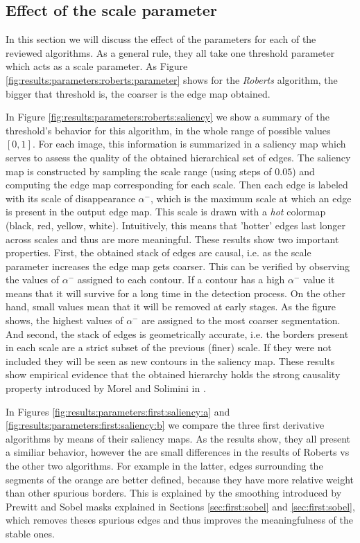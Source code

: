 \documentclass{ipol}
\numberwithin{equation}{section}
\numberwithin{table}{section}
\begin{document}
\subsection{Effect of the scale parameter}
In this section we will discuss the effect of the parameters for each of the reviewed algorithms. As a general rule, they all take one threshold parameter which acts as a scale parameter. As Figure \ref{fig:results:parameters:roberts:parameter} shows for the \emph{Roberts} algorithm, the bigger that threshold is, the coarser is the edge map obtained.

In Figure \ref{fig:results:parameters:roberts:saliency} we show a summary of the threshold's behavior for this algorithm, in the whole range of possible values $[0,1]$. For each image, this information is summarized in a saliency map which serves to assess the quality of the obtained hierarchical set of edges.
The saliency map is constructed by sampling the scale range (using steps of $0.05$) and computing the edge map corresponding for each scale. Then each edge is labeled with its scale of disappearance $\alpha^-$, which is the maximum scale at which an edge is present in the output edge map. This scale is drawn with a \emph{hot} colormap (black, red, yellow, white). Intuitively, this means that 'hotter' edges last longer across scales and thus are more meaningful.
These results show two important properties. First, the obtained stack of edges are causal, i.e. as the scale parameter increases the edge map gets coarser. This can be verified by observing the values of $\alpha^-$ assigned to each contour.
If a contour has a high $\alpha^-$ value it means that it will survive for a long time in the detection process. On the other hand, small values mean that it will be removed at early stages.
As the figure shows, the highest values of $\alpha^-$ are assigned to the most coarser segmentation.
And second, the stack of edges is geometrically accurate, i.e. the borders present in each scale are a strict subset of the previous (finer) scale. If they were not included they will be seen as new contours in the saliency map.
These results show empirical evidence that the obtained hierarchy holds the strong causality property introduced by Morel and Solimini in \cite{book:morel:95:variational_pde}.

In Figures \ref{fig:results:parameters:first:saliency:a} and \ref{fig:results:parameters:first:saliency:b} we compare the three first derivative algorithms by means of their saliency maps. As the results show, they all present a similiar behavior, however the are small differences in the results of Roberts vs the other two algorithms. For example in the latter, edges surrounding the segments of the orange are better defined, because they have more relative weight than other spurious borders. This is explained by the smoothing introduced by Prewitt and Sobel masks explained in Sections \ref{sec:first:sobel} and \ref{sec:first:sobel}, which removes theses spurious edges and thus improves the meaningfulness of the stable ones.
\end{document}
